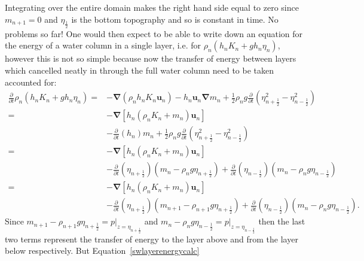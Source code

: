 \documentclass[12pt,a4paper]{report}
\newcommand*\equref[1]{Equation~\eqref{#1}}
\newcommand*{\half}{\frac{1}{2}}
\begin{document}
    Integrating over the entire domain makes the right hand side equal to zero since
    $m_{n+1} = 0$ and $\eta_{\half }$ is the bottom topography and so is constant in
    time. No problems so far! One would then expect to be able to write down
    an equation for the energy of a water column in a single layer, i.e. for 
    $\rho_{n}\left(h_{n} K_{n}+ g h_{n}\eta_{n}\right)$, however this is not
    so simple because now the transfer of energy between layers which cancelled neatly
    in through the full water column need to be taken accounted for:
    \begin{equation}
    \label{swlayerenergycalc}
    \begin{split}
    \frac{\partial}{\partial t}\rho_{n}\left(h_{n} K_{n}+ g h_{n}\eta_{n}\right) 
    =& - \boldsymbol{\nabla} \left(\rho_{n} h_{n} K_{n} \boldsymbol{u}_{n}\right) 
    - h_{n} \boldsymbol{u}_{n}  \boldsymbol{\nabla} m_{n}
    +\half  \rho_{n} g \frac{\partial}{\partial t}\left(\eta_{n+\half }^{2} -\eta_{n-\half }^{2}\right) \\
    =& - \boldsymbol{\nabla} \left[h_{n}  \left(\rho_{n}K_{n}+ m_{n}\right) \boldsymbol{u}_{n}\right] \\
    &- \frac{\partial}{\partial t}\left(h_{n}\right)   m_{n}
    +\half  \rho_{n} g \frac{\partial}{\partial t}\left(\eta_{n+\half }^{2} -\eta_{n-\half }^{2}\right) \\
    =& -\boldsymbol{\nabla} \left[h_{n} \left(\rho_{n}K_{n}+m_{n}\right) \boldsymbol{u}_{n}\right] \\
    &- \frac{\partial}{\partial t}\left(\eta_{n+\half }\right)\left(   m_{n}- \rho_{n}g \eta_{n+\half }\right) 
    + \frac{\partial}{\partial t}\left(\eta_{n-\half }\right)\left(   m_{n}- \rho_{n}g \eta_{n-\half }\right) \\
    =& -\boldsymbol{\nabla} \left[h_{n} \left(\rho_{n}K_{n}+m_{n}\right) \boldsymbol{u}_{n}\right] \\
    &- \frac{\partial}{\partial t}\left(\eta_{n+\half }\right)\left(   m_{n+1} - \rho_{n+1}g \eta_{n+\half }\right) 
    + \frac{\partial}{\partial t}\left(\eta_{n-\half }\right)\left(   m_{n}- \rho_{n}g \eta_{n-\half }\right).
    \end{split}
    \end{equation}
    Since $m_{n+1} - \rho_{n+1}g \eta_{n+\half }=p\rvert_{z=\eta_{n+\half }}$ and
    $m_{n} - \rho_{n}g \eta_{n-\half }=p\rvert_{z=\eta_{n-\half }}$ then the last
    two terms represent the transfer of energy to the layer above and from the layer below
    respectively. But \equref{swlayerenergycalc}
\end{document}
